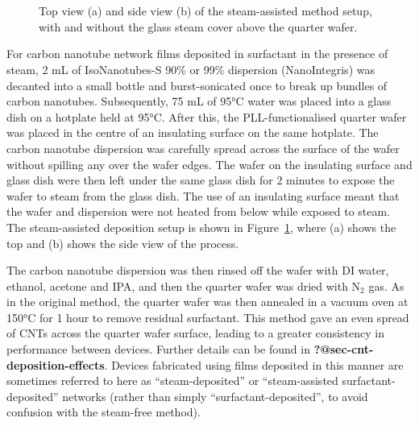 \documentclass[
  a4paper,
]{scrbook}
\begin{document}
\begin{figure}
\begin{minipage}[t]{0.03\linewidth}
\end{minipage}%
%
\begin{minipage}[t]{0.01\linewidth}

{\centering 

~

}

\end{minipage}%
%
\begin{minipage}[t]{0.45\linewidth}

{\centering 


}

\end{minipage}%
%
\begin{minipage}[t]{0.01\linewidth}

{\centering 

~

}

\end{minipage}%

\caption{\label{fig-steaming-method}Top view (a) and side view (b) of
the steam-assisted method setup, with and without the glass steam cover
above the quarter wafer.}

\end{figure}

For carbon nanotube network films deposited in surfactant in the
presence of steam, 2 mL of IsoNanotubes-S 90\% or 99\% dispersion
(NanoIntegris) was decanted into a small bottle and burst-sonicated once
to break up bundles of carbon nanotubes. Subsequently, 75 mL of 95°C
water was placed into a glass dish on a hotplate held at 95°C. After
this, the PLL-functionalised quarter wafer was placed in the centre of
an insulating surface on the same hotplate. The carbon nanotube
dispersion was carefully spread across the surface of the wafer without
spilling any over the wafer edges. The wafer on the insulating surface
and glass dish were then left under the same glass dish for 2 minutes to
expose the wafer to steam from the glass dish. The use of an insulating
surface meant that the wafer and dispersion were not heated from below
while exposed to steam. The steam-assisted deposition setup is shown in
Figure~\ref{fig-steaming-method}, where (a) shows the top and (b) shows
the side view of the process.

The carbon nanotube dispersion was then rinsed off the wafer with DI
water, ethanol, acetone and IPA, and then the quarter wafer was dried
with N\(_2\) gas. As in the original method, the quarter wafer was then
annealed in a vacuum oven at 150°C for 1 hour to remove residual
surfactant. This method gave an even spread of CNTs across the quarter
wafer surface, leading to a greater consistency in performance between
devices. Further details can be found in
\textbf{?@sec-cnt-deposition-effects}. Devices fabricated using films
deposited in this manner are sometimes referred to here as
``steam-deposited'' or ``steam-assisted surfactant-deposited'' networks
(rather than simply ``surfactant-deposited'', to avoid confusion with
the steam-free method).
\end{document}
